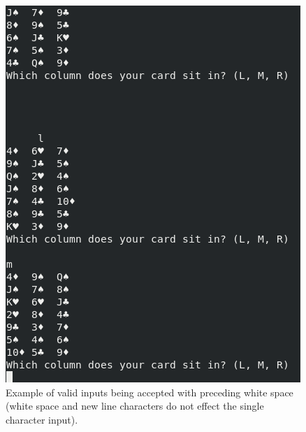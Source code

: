 \documentclass[11]{article}
\begin{document}
				\begin{figure}[h!]
					\caption{Example of valid inputs being accepted with preceding white space (white space and new line characters do not effect the single character input).}
					\centering
					\includegraphics[scale=0.36]{IndexWhitespaceValid.png}
				\end{figure}
			
			\newpage \clearpage
\end{document}
